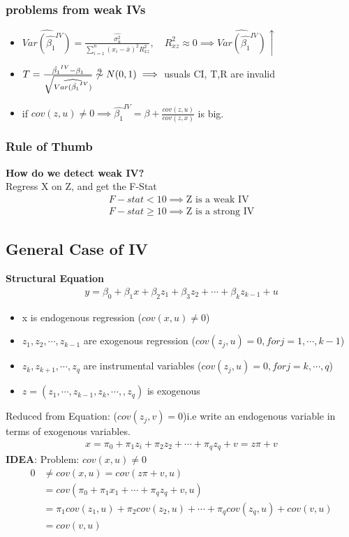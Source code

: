 \documentclass{article}
\theoremstyle{definition}
\theoremstyle{thrm}
\theoremstyle{lma}
\theoremstyle{ppst}
\theoremstyle{crlr}
\begin{document}
\subsubsection{problems from weak IVs}
\begin{itemize}
	\item $\widehat{Var(\hat{\beta_1}^{IV})} = \frac{\hat{\sigma_u^2}}{\sum_{i=1}^n(x_i-\bar{x})^2R_{xz}^2},\quad R_{xz}^2\approx 0 \implies \widehat{Var(\hat{\beta_1}^{IV})}\uparrow$
	\item $T = \frac{\hat{\beta_1}^{IV}-\beta_1}{\sqrt{\widehat{Var(\hat{\beta_1}^{IV})}}} \not\stackrel{a}{\sim} N(0,1) \implies $ usuals CI, T,R are invalid
	\item if $cov(z,u)\neq 0 \implies \hat{\beta_1}^{IV} =\beta + \frac{cov(z,u)}{cov(z,x)} $ is big. 
\end{itemize}
\subsubsection{Rule of Thumb}
\textbf{How do we detect weak IV?}\\
Regress X on Z, and get the F-Stat
\begin{align*}
	F-stat<10\implies \text{Z is a weak IV}\\
	F-stat\geq10\implies \text{Z is a strong IV}
\end{align*}

\subsection{General Case of IV}
\textbf{Structural Equation}
\begin{align*}
	y = \beta_0+\beta_1x+\beta_2z_1+\beta_3z_2+\cdots+\beta_k z_{k-1}+u
\end{align*}
\begin{itemize}
	\item x is endogenous regression ($cov(x,u)\neq 0$)
	\item $z_1,z_2,\cdots,z_{k-1}$ are exogenous regression ($cov(z_j,u) = 0, for j = 1,\cdots, k-1$)
	\item $z_k,z_{k+1},\cdots,z_{q}$ are instrumental variables ($cov(z_j,u) = 0, for j = k,\cdots, q$)
	\item $z = (z_1,\cdots,z_{k-1},z_k,\cdots,,z_q)$ is exogenous
\end{itemize}
Reduced from Equation: ($cov(z_j,v) = 0$)i.e write an endogenous variable in terms of exogenous variables.
\begin{align*}
	x = \pi_0+\pi_1z_i+\pi_2z_2+\cdots+\pi_qz_q+v = z\pi+v
\end{align*}
\textbf{IDEA}: Problem: $cov(x,u)\neq 0$
\begin{align*}
	0 &\neq cov(x,u) = cov(z\pi+v,u)\\
	&=cov(\pi_0+\pi_1x_1+\cdots+\pi_q z_q+v,u)\\
	&= \pi_1cov(z_1,u)+\pi_2cov(z_2,u) +\cdots+\pi_q cov(z_q,u)+cov(v,u)\\
	&=cov(v,u)
\end{align*}
\end{document}
